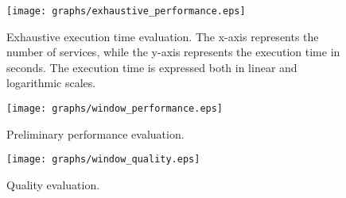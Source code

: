 \begin{figure}
  \texttt{[image: graphs/exhaustive\_performance.eps]}
  \caption{Exhaustive execution time evaluation. The x-axis represents the number of services, while the y-axis represents the execution time in seconds. The execution time is expressed both in linear and logarithmic scales.}
  \label{fig:perf_exhaustive}
\end{figure}

\begin{figure}[ht!]
  \texttt{[image: graphs/window\_performance.eps]}
  \caption{Preliminary performance evaluation.}
  \label{fig:perf_window}
\end{figure}


\begin{figure}[ht!]
  \texttt{[image: graphs/window\_quality.eps]}
  \caption{Quality evaluation.}
  \label{fig:quality_window}
\end{figure}

\usetikzlibrary{positioning}
\usetikzlibrary{backgrounds}



